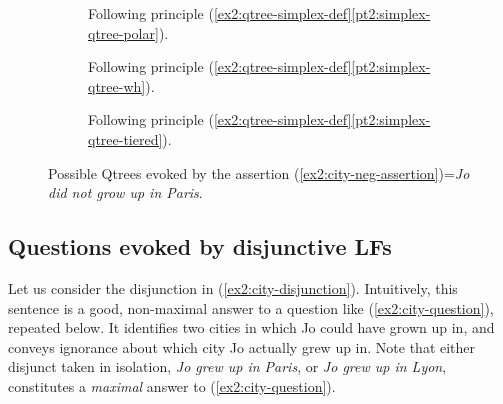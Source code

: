 \begin{figure}[H]
	\centering
	\begin{subfigure}[t]{.23\linewidth}
		\centering
		\caption{Following principle (\ref{ex2:qtree-simplex-def}\ref{pt2:simplex-qtree-polar}).}\label{fig2:neg-city-qtree-polar}
	\end{subfigure}
	\hfill
	\begin{subfigure}[t]{.33\linewidth}
		\centering		{}
		\caption{Following principle (\ref{ex2:qtree-simplex-def}\ref{pt2:simplex-qtree-wh}).}\label{fig2:neg-city-qtree-wh}
	\end{subfigure}
	\hfill
	\begin{subfigure}[t]{.38\linewidth}
		\centering{}
		\caption{Following principle (\ref{ex2:qtree-simplex-def}\ref{pt2:simplex-qtree-tiered}).}\label{fig2:neg-city-qtree-tiered}
	\end{subfigure}
	\caption{Possible Qtrees evoked by the assertion (\ref{ex2:city-neg-assertion})=\textit{Jo did not grow up in Paris}.}\label{fig2:neg-city-qtrees}
\end{figure}


\subsection{Questions evoked by disjunctive LFs}\label{sec:disjunctive-qtrees}

Let us consider the disjunction in (\ref{ex2:city-disjunction}). Intuitively, this sentence is a good, non-maximal answer to a question like (\ref{ex2:city-question}), repeated below. It identifies two cities in which Jo could have grown up in, and conveys ignorance about which city Jo actually grew up in. Note that either disjunct taken in isolation, \textit{Jo grew up in Paris}, or \textit{Jo grew up in Lyon}, constitutes a \textit{maximal} answer to (\ref{ex2:city-question}).


